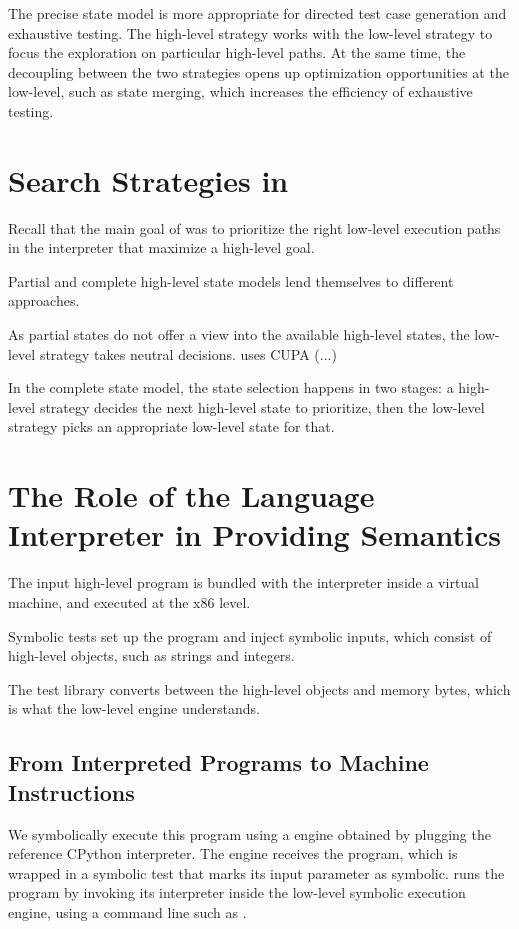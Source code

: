 The precise state model is more appropriate for directed test case generation and exhaustive testing.
%
The high-level strategy works with the low-level strategy to focus the exploration on particular high-level paths.  At the same time, the decoupling between the two strategies opens up optimization opportunities at the low-level, such as state merging, which increases the efficiency of exhaustive testing.

\iffalse
\section{Search Strategies in \chef}

Recall that the main goal of \chef was to prioritize the right low-level execution paths in the interpreter that maximize a high-level goal.

Partial and complete high-level state models lend themselves to different approaches.

As partial states do not offer a view into the available high-level states, the low-level strategy takes neutral decisions.
%
\chef uses CUPA (...)

In the complete state model, the state selection happens in two stages: a high-level strategy decides the next high-level state to prioritize, then the low-level strategy picks an appropriate low-level state for that.


\section{The Role of the Language Interpreter in Providing Semantics}

The input high-level program is bundled with the interpreter inside a virtual machine, and executed at the x86 level.

Symbolic tests set up the program and inject symbolic inputs, which consist of high-level objects, such as strings and integers.

The test library converts between the high-level objects and memory bytes, which is what the low-level engine understands.

\subsection{From Interpreted Programs to Machine Instructions}

We symbolically execute this program using a \chef engine obtained by plugging the reference CPython interpreter.
%
The \chef engine receives the program, which is wrapped in a symbolic test that marks its input parameter  as symbolic.
%
\chef runs the program by invoking its interpreter inside the low-level symbolic execution engine, using a command line such as .

